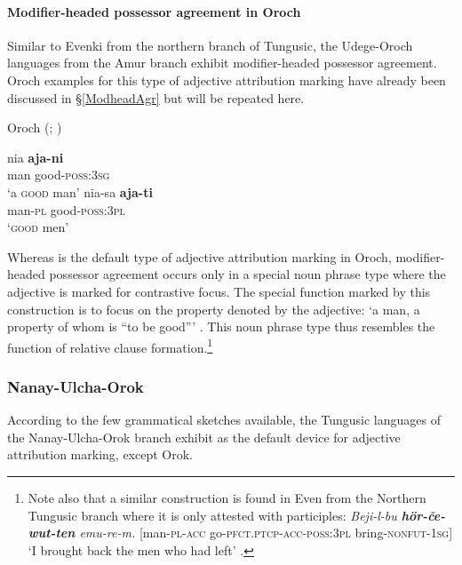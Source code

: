 \paragraph*{Modifier\hyp{}headed possessor agreement in Oroch}
Similar to Evenki from the northern branch of Tungusic, the Udege-Oroch languages from the Amur branch exhibit modifier\hyp{}headed possessor agreement. Oroch examples for this type of adjective attribution marking have already been discussed in \S\ref{ModheadAgr} but will be repeated here.
\begin{exe}
\ex 
\label{oroch modhead}
{\rm Oroch (\citealt[207]{avrorin-etal1967}; \citealt[3]{malchukov2000})}
\begin{xlist}
\ex
\gll 	nia	\textbf{aja-ni}\\
	man good-\textsc{poss:3sg}\\
\glt	‘a \textsc{good} man’
\ex
\gll nia-sa \textbf{aja-ti}\\	
	man-\textsc{pl} good-\textsc{poss:3pl}\\
\glt	‘\textsc{good} men’
\end{xlist}
\end{exe}
Whereas  is the default type of adjective attribution marking in Oroch, modifier\hyp{}headed possessor agreement occurs only in a special noun phrase type where the adjective is marked for contrastive focus. The special function marked by this construction is to focus on the property denoted by the adjective: ‘a man, a property of whom is “to be good”’ \citep[3]{malchukov2000}. This noun phrase type thus resembles the function of relative clause formation.\footnote{Note also that a similar construction is found in Even from the Northern Tungusic branch where it is only attested with participles: \textit{Beji-l-bu \textbf{hör-če-wut-ten} emu-re-m.} [man-\textsc{pl}-\textsc{acc} go-\textsc{pfct.ptcp}-\textsc{acc}-\textsc{poss:3pl} bring-\textsc{nonfut}-\textsc{1sg}] ‘I brought back the men who had left’ \citep[31]{malchukov1995}.}

\subsubsection{Nanay-Ulcha-Orok}
According to the few grammatical sketches available, the Tungusic languages of the Nanay-Ulcha-Orok branch exhibit  as the default device for adjective attribution marking, except Orok.

